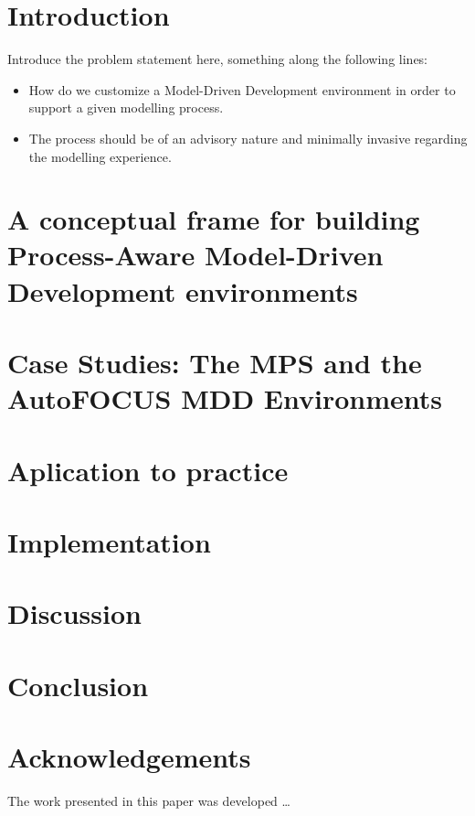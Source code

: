 \section{Introduction}

Introduce the problem statement here, something along the following
lines: 

\begin{itemize}
  \item How do we customize a Model-Driven Development environment in order to
  support a given modelling process.
  \item The process should be of an advisory nature and minimally invasive
  regarding the modelling experience.
\end{itemize} 

\section{A conceptual frame for building Process-Aware Model-Driven Development
environments}


\section{Case Studies: The MPS and the AutoFOCUS MDD Environments}


\section{Aplication to practice}
 

\section{Implementation}


\section{Discussion}

\section{Conclusion} 

\section*{Acknowledgements}
The work presented in this paper was developed \ldots







